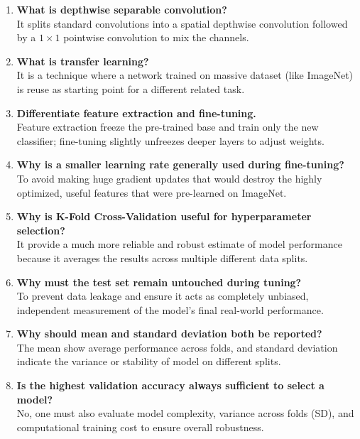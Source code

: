 \documentclass[10pt]{article}
\begin{document}
\begin{enumerate}
It utilize depthwise separable convolutions and inverted residual blocks, which heavily reduce total parameters and floating-point computations.
\vspace{2mm}
\item \textbf{What is depthwise separable convolution?} \\
It splits standard convolutions into a spatial depthwise convolution followed by a $1\times1$ pointwise convolution to mix the channels.
\vspace{2mm}
\item \textbf{What is transfer learning?} \\
It is a technique where a network trained on massive dataset (like ImageNet) is reuse as starting point for a different related task.
\vspace{2mm}
\item \textbf{Differentiate feature extraction and fine-tuning.} \\
Feature extraction freeze the pre-trained base and train only the new classifier; fine-tuning slightly unfreezes deeper layers to adjust weights.
\vspace{2mm}
\item \textbf{Why is a smaller learning rate generally used during fine-tuning?} \\
To avoid making huge gradient updates that would destroy the highly optimized, useful features that were pre-learned on ImageNet.
\vspace{2mm}
\item \textbf{Why is K-Fold Cross-Validation useful for hyperparameter selection?} \\
It provide a much more reliable and robust estimate of model performance because it averages the results across multiple different data splits.
\vspace{2mm}
\item \textbf{Why must the test set remain untouched during tuning?} \\
To prevent data leakage and ensure it acts as completely unbiased, independent measurement of the model's final real-world performance.
\vspace{2mm}
\item \textbf{Why should mean and standard deviation both be reported?} \\
The mean show average performance across folds, and standard deviation indicate the variance or stability of model on different splits.
\vspace{2mm}
\item \textbf{Is the highest validation accuracy always sufficient to select a model?} \\
No, one must also evaluate model complexity, variance across folds (SD), and computational training cost to ensure overall robustness.
\end{enumerate}
\end{document}
